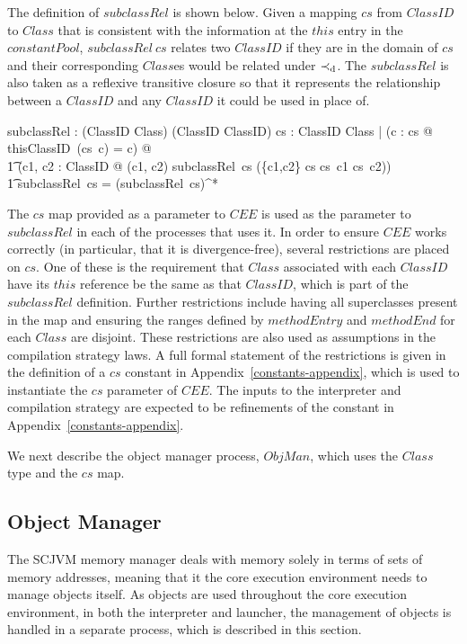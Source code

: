 The definition of $subclassRel$ is shown below.
Given a mapping $cs$ from $ClassID$ to $Class$ that is consistent with
the information at the $this$ entry in the $constantPool$,
$subclassRel~cs$ relates two $ClassID$ if they are in the domain of
$cs$ and their corresponding $Class$es would be related under
$\prec_{\mathrm{d}}$.
The $subclassRel$ is also taken as a reflexive transitive closure so
that it represents the relationship between a $ClassID$ and any
$ClassID$ it could be used in place of.
\begin{axdef}
  subclassRel : (ClassID \pfun Class) \fun (ClassID \rel ClassID)
  \where
  \forall cs : ClassID \pfun Class | (\forall c : \dom cs @ thisClassID~(cs~c) = c) @\\
  \t1 (\forall c1, c2 : ClassID @ (c1, c2) \in subclassRel~cs \iff (\{c1,c2\} \subseteq \dom cs \land cs~c1 \directsubclass cs~c2)) \\
  \t1 \land subclassRel~cs = (subclassRel~cs)^*
\end{axdef}

The $cs$ map provided as a parameter to $CEE$ is used as the parameter
to $subclassRel$ in each of the processes that uses it.
In order to ensure $CEE$ works correctly (in particular, that it is
divergence-free), several restrictions are placed on $cs$.
One of these is the requirement that $Class$ associated with each
$ClassID$ have its $this$ reference be the same as that $ClassID$,
which is part of the $subclassRel$ definition.
Further restrictions include having all superclasses present in the
map and ensuring the ranges defined by $methodEntry$ and $methodEnd$
for each $Class$ are disjoint.
These restrictions are also used as assumptions in the compilation
strategy laws.
A full formal statement of the restrictions is given in the definition
of a $cs$ constant in Appendix~\ref{constants-appendix}, which is used
to instantiate the $cs$ parameter of $CEE$.
The inputs to the interpreter and compilation strategy are expected to
be refinements of the constant in Appendix~\ref{constants-appendix}.

We next describe the object manager process, $ObjMan$, which uses the
$Class$ type and the $cs$ map.

\subsection{Object Manager}
\label{cee-object-manager-subsection}

The SCJVM memory manager deals with memory solely in terms of sets of
memory addresses, meaning that it the core execution environment needs
to manage objects itself.
As objects are used throughout the core execution environment, in both
the interpreter and launcher, the management of objects is handled in
a separate \Circus{} process, which is described in this section.

